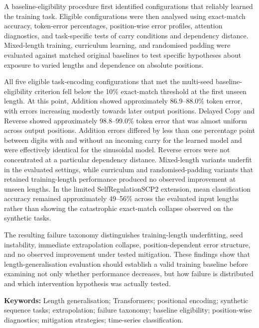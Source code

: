 \documentclass[
    author={Aanchala Ravindra Bhongade},
    supervisor={Dr. Fernando Moreno-Pino},
    degree={MSc},
    title={Length Generalisation in Transformer-Based Sequence Models: Failure Taxonomy and Mitigation Strategies},
    subtitle={},
    type={},
    year={2026}
]{dissertation}
\begin{document}
A baseline-eligibility procedure first identified configurations that reliably learned the training task. Eligible configurations were then analysed using exact-match accuracy, token-error percentages, position-wise error profiles, attention diagnostics, and task-specific tests of carry conditions and dependency distance. Mixed-length training, curriculum learning, and randomised padding were evaluated against matched original baselines to test specific hypotheses about exposure to varied lengths and dependence on absolute positions.

All five eligible task-encoding configurations that met the multi-seed baseline-eligibility criterion fell below the 10\% exact-match
threshold at the first unseen length. At this point, Addition showed
approximately 86.9--88.0\% token error, with errors increasing modestly towards later output positions. Delayed Copy and Reverse showed approximately 98.8--99.0\% token error that was almost uniform across output positions. Addition errors differed by less than one percentage point between digits with and without an incoming carry for the learned model and were effectively identical for the sinusoidal model. Reverse errors were not concentrated at a particular dependency distance. Mixed-length variants underfit in the evaluated settings, while curriculum and randomised-padding variants that retained training-length performance produced no observed improvement at unseen lengths. In the limited SelfRegulationSCP2 extension, mean classification accuracy remained approximately 49--56\% across the evaluated input lengths rather than showing the catastrophic exact-match collapse observed on the synthetic tasks.

The resulting failure taxonomy distinguishes training-length underfitting, seed instability, immediate extrapolation collapse, position-dependent error structure, and no observed improvement under tested mitigation. These findings show that length-generalisation evaluation should establish a valid training baseline before examining not only whether performance decreases, but how failure is distributed and which intervention hypothesis was actually tested.

\vfill

\noindent
\textbf{Keywords:} Length generalisation; Transformers; positional encoding; synthetic sequence tasks; extrapolation; failure taxonomy; baseline
eligibility; position-wise diagnostics; mitigation strategies; time-series classification.


\mainmatter
\end{document}
